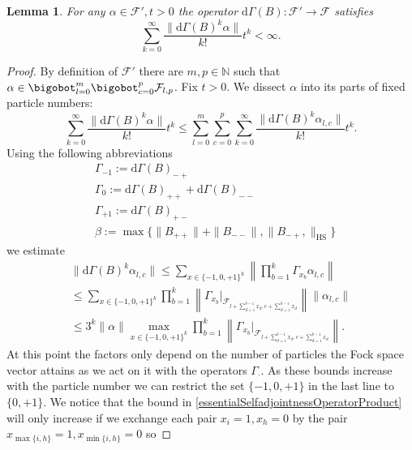 \documentclass[b5paper,draft,openbib,12pt]{memoir}
\newtheorem{Lemma}[Def]{Lemma}
\begin{document}
\begin{Lemma}\label{Gamma exponential bound}
For any \( \alpha \in \mathcal{F}', t>0\) the operator \(\mathrm{d}\Gamma(B):\mathcal{F}'\rightarrow \mathcal{F}\) satisfies
\begin{equation}
\sum_{k=0}^\infty \frac{\|\mathrm{d}\Gamma(B)^k \alpha\|}{k!} t^k <\infty.
\end{equation}
\end{Lemma}
\begin{proof}
 By definition of \(\mathcal{F}'\) there are \(m,p\in\mathbb{N}\) such that \(\alpha \in \bigobot_{l=0}^m\bigobot_{c=0}^p \mathcal{F}_{l,p}\). Fix \(t>0\). 
We dissect \(\alpha\) into its parts of fixed particle numbers:
\begin{equation}
\sum_{k=0}^\infty \frac{\|\mathrm{d}\Gamma(B)^k \alpha\|}{k!} t^k \le \sum_{l=0}^m\sum_{c=0}^p \sum_{k=0}^\infty \frac{\|\mathrm{d}\Gamma(B)^k \alpha_{l,c}\|}{k!} t^k .
\end{equation}
 Using the following abbreviations
\begin{align}
&\Gamma_{-1}:=\mathrm{d}\Gamma(B)_{-+}\\
&\Gamma_0:=\mathrm{d}\Gamma(B)_{++}+\mathrm{d}\Gamma(B)_{--}\\
&\Gamma_{+1}:=\mathrm{d}\Gamma(B)_{+-}\\
&\beta:=\max\{\|B_{++}\|+\|B_{--}\|,\|B_{-+},\|_{\mathrm{HS}}\}
\end{align}
we estimate
\begin{align}\nonumber
\|\mathrm{d}\Gamma(B)^k \alpha_{l,c}\|\le \sum_{x\in \{-1,0,+1\}^k} \left\| \prod_{b=1}^k \Gamma_{x_b}\alpha_{l,c}\right\|\\\label{essentialSelfadjointnessOperatorProduct}
\le  \sum_{x\in \{-1,0,+1\}^k} \prod_{b=1}^k \left\| \Gamma_{x_b}|_{\mathcal{F}_{l+\sum_{d=1}^{b-1} x_d,c+\sum_{d=1}^{b-1} x_d}}\right\| \|\alpha_{l,c}\|\\
\le 3^k \|\alpha\| \max_{x\in \{-1,0,+1\}^k} \prod_{b=1}^k\left\| \Gamma_{x_b}|_{\mathcal{F}_{l+\sum_{d=1}^{b-1} x_d,c+\sum_{d=1}^{b-1} x_d}}\right\|  .
\end{align}
At this point the factors only depend on the number of particles the Fock space 
vector attains as we act on it with the operators \(\Gamma_{\cdot}\). 
As these bounds increase with the particle number we can restrict the set 
\(\{-1,0,+1\}\) in the last line to \(\{0,+1\}\).
We notice that the bound in \eqref{essentialSelfadjointnessOperatorProduct} 
will only increase if  we exchange each pair 
\(x_{i}=1, x_{h}=0\) by the pair \(x_{\max\{i,h\}}=1, x_{\min\{i,h\}}=0\) so 

\end{proof}
\end{document}
